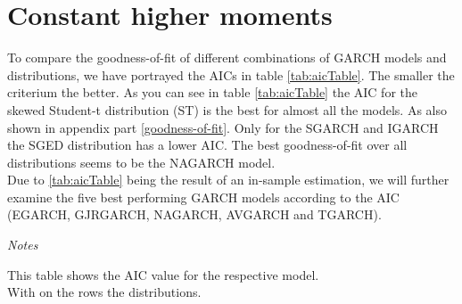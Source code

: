 \documentclass[a4paper, nobind]{templates/ociamthesis}
\begin{document}
\newpage

\hypertarget{constant-higher-moments}{%
\section{Constant higher moments}\label{constant-higher-moments}}

\noindent To compare the goodness-of-fit of different combinations of GARCH models and distributions, we have portrayed the AICs in table \ref{tab:aicTable}. The smaller the criterium the better. As you can see in table \ref{tab:aicTable} the AIC for the skewed Student-t distribution (ST) is the best for almost all the models. As also shown in appendix part \ref{goodness-of-fit}. Only for the SGARCH and IGARCH the SGED distribution has a lower AIC. The best goodness-of-fit over all distributions seems to be the NAGARCH model.~\\

\noindent  Due to \ref{tab:aicTable} being the result of an in-sample estimation, we will further examine the five best performing GARCH models according to the AIC (EGARCH, GJRGARCH, NAGARCH, AVGARCH and TGARCH).

\begin{table}[h!]

\caption{\label{tab:aicTable}Model selection according to AIC}
\centering
\begin{threeparttable}
\begin{tablenotes}
\item \textit{Notes} 
\item This table shows the AIC value for the respective model. \\ With on the rows the distributions. 
\end{tablenotes}
\end{threeparttable}
\end{table}
\end{document}
